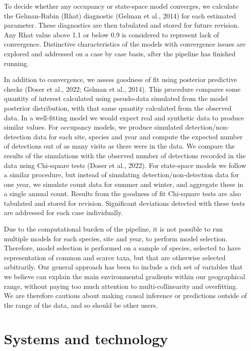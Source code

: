 \documentclass[utf8]{frontiersSCNS}
\begin{document}
To decide whether any occupancy or state-space model converges, we
calculate the Gelman-Rubin (Rhat) diagnostic (Gelman et al., 2014) for
each estimated parameter. These diagnostics are then tabulated and
stored for future revision. Any Rhat value above 1.1 or below 0.9 is
considered to represent lack of convergence. Distinctive characteristics
of the models with convergence issues are explored and addressed on a
case by case basis, after the pipeline has finished running.

In addition to convergence, we assess goodness of fit using posterior
predictive checks (Doser et al., 2022; Gelman et al., 2014). This
procedure compares some quantity of interest calculated using
pseudo-data simulated from the model posterior distribution, with that
same quantity calculated from the observed data. In a well-fitting model
we would expect real and synthetic data to produce similar values. For
occupancy models, we produce simulated detection/non-detection data for
each site, species and year and compute the expected number of
detections out of as many visits as there were in the data. We compare
the results of the simulations with the observed number of detections
recorded in the data using Chi-square tests (Doser et al., 2022). For
state-space models we follow a similar procedure, but instead of
simulating detection/non-detection data for one year, we simulate count
data for summer and winter, and aggregate these in a single annual
count. Results from the goodness of fit Chi-square tests are also
tabulated and stored for revision. Significant deviations detected with
these tests are addressed for each case individually.

Due to the computational burden of the pipeline, it is not possible to
run multiple models for each species, site and year, to perform model
selection. Therefore, model selection is performed on a sample of
species, selected to have representation of common and scarce taxa, but
that are otherwise selected arbitrarily. Our general approach has been
to include a rich set of variables that we believe can explain the main
environmental gradients within our geographical range, without paying
too much attention to multi-collinearity and overfitting. We are
therefore cautious about making causal inference or predictions outside
of the range of the data, and so should be other users.

\hypertarget{systems-and-technology}{%
\section*{Systems and technology}\label{systems-and-technology}}
\end{document}

